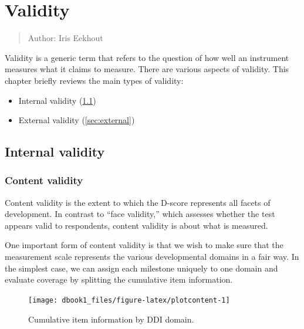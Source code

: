 \documentclass[
]{book}
\providecommand{\tightlist}{%
  \setlength{\itemsep}{0pt}\setlength{\parskip}{0pt}}
\begin{document}
\hypertarget{ch:validity}{%
\chapter{Validity}\label{ch:validity}}

\begin{quote}
Author: Iris Eekhout
\end{quote}

Validity is a generic term that refers to the question of how well an instrument measures what it claims to measure. There are various aspects of validity. This chapter briefly reviews the main types of validity:

\begin{itemize}
\tightlist
\item
  Internal validity (\ref{sec:internal})
\item
  External validity (\ref{sec:external})
\end{itemize}

\hypertarget{sec:internal}{%
\section{Internal validity}\label{sec:internal}}

\hypertarget{content-validity}{%
\subsection{Content validity}\label{content-validity}}

Content validity is the extent to which the D-score represents all facets of development. In contrast to ``face validity,'' which assesses whether the test appears valid to respondents, content validity is about what is measured.

One important form of content validity is that we wish to make sure that the measurement scale represents the various developmental domains in a fair way. In the simplest case, we can assign each milestone uniquely to one domain and evaluate coverage by splitting the cumulative item information.

\begin{figure}

{\centering \texttt{[image: dbook1\_files/figure-latex/plotcontent-1]} 

}

\caption{Cumulative item information by DDI domain.}\label{fig:plotcontent}
\end{figure}
\end{document}

